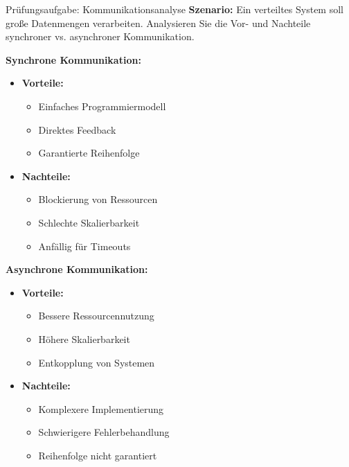 \begin{example2}{Prüfungsaufgabe: Kommunikationsanalyse}
\textbf{Szenario:}
Ein verteiltes System soll große Datenmengen verarbeiten. Analysieren Sie die Vor- und Nachteile synchroner vs. asynchroner Kommunikation.

\textbf{Synchrone Kommunikation:}
\begin{itemize}
    \item \textbf{Vorteile:}
    \begin{itemize}
        \item Einfaches Programmiermodell
        \item Direktes Feedback
        \item Garantierte Reihenfolge
    \end{itemize}
    \item \textbf{Nachteile:}
    \begin{itemize}
        \item Blockierung von Ressourcen
        \item Schlechte Skalierbarkeit
        \item Anfällig für Timeouts
    \end{itemize}
\end{itemize}

\textbf{Asynchrone Kommunikation:}
\begin{itemize}
    \item \textbf{Vorteile:}
    \begin{itemize}
        \item Bessere Ressourcennutzung
        \item Höhere Skalierbarkeit
        \item Entkopplung von Systemen
    \end{itemize}
    \item \textbf{Nachteile:}
    \begin{itemize}
        \item Komplexere Implementierung
        \item Schwierigere Fehlerbehandlung
        \item Reihenfolge nicht garantiert
    \end{itemize}
\end{itemize}
\end{example2}


